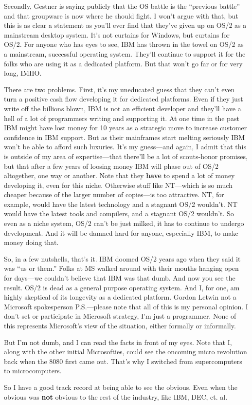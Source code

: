 Secondly, Gestner is saying publicly that the OS battle is the ``previous
battle'' and that groupware is now where he should fight.  I won't argue
with that, but this is as clear a statement as you'll ever find that they've
given up on OS/2 as a mainstream desktop system.  It's not curtains for
Windows, but curtains for OS/2.   For anyone who has eyes to see, IBM
has thrown in the towel on OS/2 as a mainstream, successful operating system.
They'll continue to support it for the folks who are using it as a
dedicated platform.  But that won't go far or for very long, IMHO.

There are two problems.  First, it's my uneducated guess that they can't
even turn a positive cash flow developing it for dedicated platforms.
Even if they just write off the billions blown, IBM is not an efficient
developer and they'll have a hell of a lot of programmers writing and
supporting it.  At one time in the past IBM might have lost money for
10 years as a strategic move to increase customer confidence in IBM
support.  But as their mainframes start melting seriously IBM won't be
able to afford such luxuries.  It's my guess---and again, I admit that
this is outside of my area of expertise---that there'll be a lot of
scouts-honor promises, but that after a few years of loosing money
IBM will phase out of OS/2 altogether, one way or another.  Note that they
{\bf have} to spend a lot of money developing it, even for this niche. Otherwise
stuff like NT---which is so much cheaper because of the larger number
of copies---is too attractive.  NT, for example, would have the latest
technology and a stagnant OS/2 wouldn't.  NT would have the latest tools
and compilers, and a stagnant OS/2 wouldn't.  So even as a niche system,
OS/2 can't be just milked, it has to continue to undergo development.
And it will be damned hard for anyone, especially IBM, to make money
doing that.

So, in a few nutshells, that's it.  IBM doomed OS/2 years ago when
they said it was ``us or them.''  Folks at MS walked around with their
mouths hanging open for days---we couldn't believe that IBM was that
dumb.  And now you see the result.  OS/2 is dead as a general purpose
operating system.  And I, for one, am highly skeptical of its longevity
as a dedicated platform.
\medskip
{\parindent=2in\parskip=1pt \obeylines Gordon Letwin
not a Microsoft spokesperson\medskip
}
\noindent P.S.---please note that all of this is my personal opinion.  I don't
set or participate in Microsoft strategy, I'm just a programmer.  
None of this represents Microsoft's view of the situation, either
formally or informally.

But I'm not dumb, and I can read the facts in front of my eyes.  Note that
I, along with the other initial Microsofties, could see the oncoming
micro revolution back when the 8080 first came out.  That's why I
switched from supercomputers to microcomputers.  

So I have a good track record at being able to see the obvious.  Even
when the obvious was {\bf not} obvious to the rest of the industry, like
IBM, DEC, et. al.
\bye
